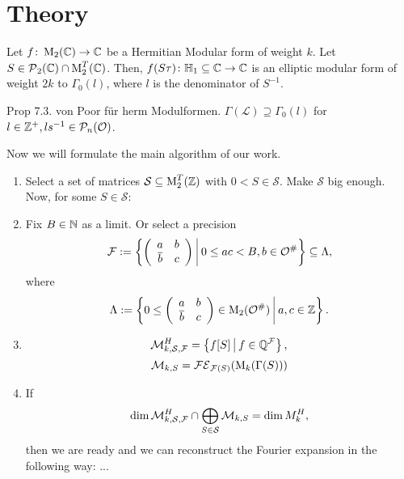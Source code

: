 
\section{Theory}


\begin{lemma}
Let $f \colon \operatorname{M}_2(\mathbb{C}) \rightarrow \mathbb{C}$ be a Hermitian Modular form of weight $k$. Let $S \in \operatorname{\mathcal{P}}_2(\mathbb{C}) \cap \operatorname{M}^T_2(\mathbb{C})$.
Then, $f(S \tau) \colon \mathbb{H}_1 \subseteq \mathbb{C} \rightarrow \mathbb{C}$ is an elliptic modular form of weight $2k$ to $\Gamma_0(l)$, where $l$ is the denominator of $S^{-1}$.  %
\end{lemma}


\begin{lemma}
Prop 7.3. von Poor für herm Modulformen.
$\Gamma(\mathcal{L}) \supseteq \Gamma_0(l)$ for $l \in \mathbb{Z}^+, ls^{-1} \in \mathcal{P}_n(\mathcal{O})$.
\end{lemma}


Now we will formulate the main algorithm of our work.

\begin{algo}
\begin{enumerate}
\item Select a set of matrices $\mathcal{S} \subseteq \operatorname{M}_2^T(\mathbb{Z})$ with $0 < S \in \mathcal{S}$. Make $\mathcal{S}$ big enough. Now, for some $S \in \mathcal{S}$:

\item Fix $B \in \mathbb{N}$ as a limit. Or select a precision
\[ \F := \Set{\SimpleMatrix{a}{b}{\overline b}{c}}{0 \le a c < B, b \in \curlO^\#} \subseteq \Lambda , \]
where
\[ \Lambda := \Set{0 \le \SimpleMatrix{a}{b}{\overline b}{c} \in \M_2(\curlO^\#)}{a,c \in \Z } . \]

\item
\[ \mathcal{M}_{k,\mathcal{S},\F}^H = \Set{f [S]}{f \in \Q^\F} , \]
\[ \mathcal{M}_{k,S} = \mathcal{FE}_{\mathcal{F}(S)}(\operatorname{M}_k(\Gamma(S))) \]

\item
If
\[ \dim \mathcal{M}_{k,\mathcal{S},\mathcal{F}}^H \cap \bigoplus_{S \in \mathcal{S}} \mathcal{M}_{k,S}
= \dim M^H_k , \]
then we are ready and we can reconstruct the Fourier expansion in the following way: ...

\end{enumerate}
\end{algo}

